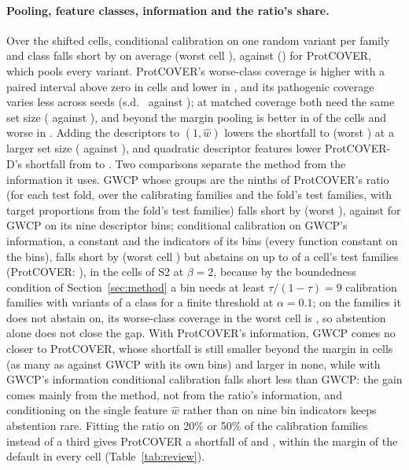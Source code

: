 \paragraph{Pooling, feature classes, information and the ratio's share.} Over the shifted cells, conditional calibration on one random variant per family and class falls short by \revSubShort{} on average (worst cell \revSubShortMax{}), against \revCrShort{} (\revCrShortMax{}) for ProtCOVER, which pools every variant. ProtCOVER's worse-class coverage is higher with a paired interval above zero in \pairRevSubPos{} cells and lower in \pairRevSubNeg{}, and its pathogenic coverage varies less across seeds (s.d.\ \revCrSdPath{} against \revSubSdPath{}); at matched coverage both need the same set size (\revMatchedSub{} against \revMatchedCr{}), and beyond the margin pooling is better in \revSubBetter{} of the \revNCells{} cells and worse in \revSubWorse{}. Adding the descriptors to $(1,\hat w)$ lowers the shortfall to \revDescShort{} (worst \revDescShortMax{}) at a larger set size (\revDescSize{} against \revCrSize{}), and quadratic descriptor features lower ProtCOVER-D's shortfall from \shortCsMean{} to \revQuadShort{}. Two comparisons separate the method from the information it uses. GWCP whose groups are the ninths of ProtCOVER's ratio (for each test fold, over the calibrating families and the fold's test families, with target proportions from the fold's test families) falls short by \revGwcpWShort{} (worst \revGwcpWShortMax{}), against \shortGwcpMean{} for GWCP on its nine descriptor bins; conditional calibration on GWCP's information, a constant and the indicators of its bins (every function constant on the bins), falls short by \revBinsShort{} (worst cell \revBinsShortMax{}) but abstains on up to \revBinsAbst{} of a cell's test families (ProtCOVER: \revCrAbst{}), in the \revBinsAbstCells{} cells of S2 at $\beta=2$, because by the boundedness condition of Section~\ref{sec:method} a bin needs at least $\tau/(1-\tau)=9$ calibration families with variants of a class for a finite threshold at $\alpha=0.1$; on the families it does not abstain on, its worse-class coverage in the worst cell is \revBinsRetWorst{}, so abstention alone does not close the gap. With ProtCOVER's information, GWCP comes no closer to ProtCOVER, whose shortfall is still smaller beyond the margin in \revGwcpWBetter{} cells (as many as against GWCP with its own bins) and larger in none, while with GWCP's information conditional calibration falls short less than GWCP: the gain comes mainly from the method, not from the ratio's information, and conditioning on the single feature $\hat w$ rather than on nine bin indicators keeps abstention rare. Fitting the ratio on 20\% or 50\% of the calibration families instead of a third gives ProtCOVER a shortfall of \revFitTwentyShort{} and \revFitFiftyShort{}, within the margin of the default in every cell (Table~\ref{tab:review}).

